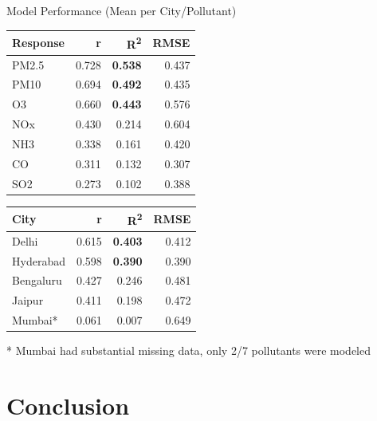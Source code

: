 \documentclass[svgnames, 12pt]{beamer}
\begin{document}
\begin{frame}{Model Performance (Mean per City/Pollutant)}
    \fontsize{11}{13}\selectfont
    \begin{table}
    \centering
    \begin{tabular}{lrrr}
    \hline
    Response & r & R\textsuperscript{2} & RMSE \\
    \hline
    PM2.5 & 0.728 & \textbf{0.538} & 0.437 \\
    PM10 & 0.694 & \textbf{0.492} & 0.435 \\
    O3 & 0.660 & \textbf{0.443} & 0.576 \\
    NOx & 0.430 & 0.214 & 0.604 \\
    NH3 & 0.338 & 0.161 & 0.420 \\
    CO & 0.311 & 0.132 & 0.307 \\
    SO2 & 0.273 & 0.102 & 0.388 \\
    \hline
    \end{tabular}
    \end{table}

    \begin{table}
    \centering
    \begin{tabular}{lrrr}
    \hline
    City & r & R\textsuperscript{2} & RMSE \\
    \hline
    Delhi & 0.615 & \textbf{0.403} & 0.412 \\
    Hyderabad & 0.598 & \textbf{0.390} & 0.390 \\
    Bengaluru & 0.427 & 0.246 & 0.481 \\
    Jaipur & 0.411 & 0.198 & 0.472 \\
    Mumbai* & 0.061 & 0.007 & 0.649 \\
    \hline
    \end{tabular}
    \end{table}
    \begin{center}
    \footnotesize{* Mumbai had substantial missing data, only 2/7 pollutants were modeled}
    \end{center}
\end{frame}

\section{Conclusion}
\end{document}
